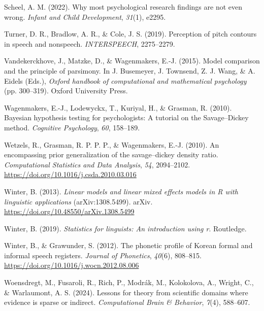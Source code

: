 \documentclass[
  doc,
  floatsintext,
  longtable,
  nolmodern,
  notxfonts,
  notimes,
  colorlinks=true,linkcolor=blue,citecolor=blue,urlcolor=blue]{apa7}
\newlength{\cslhangindent}
\newenvironment{CSLReferences}[2] %
 {\begin{list}{}{%
  \setlength{\itemindent}{0pt}
  \setlength{\leftmargin}{0pt}
  \setlength{\parsep}{0pt}
  \ifodd #1
   \setlength{\leftmargin}{\cslhangindent}
   \setlength{\itemindent}{-1\cslhangindent}
  \fi
  \setlength{\itemsep}{#2\baselineskip}}}
 {\end{list}}
\begin{document}
\begin{CSLReferences}{1}{0}
Scheel, A. M. (2022). Why most psychological research findings are not
even wrong. \emph{Infant and Child Development}, \emph{31}(1), e2295.

Turner, D. R., Bradlow, A. R., \& Cole, J. S. (2019). Perception of
pitch contours in speech and nonspeech. \emph{INTERSPEECH}, 2275--2279.

Vandekerckhove, J., Matzke, D., \& Wagenmakers, E.-J. (2015). Model
comparison and the principle of parsimony. In J. Busemeyer, J. Townsend,
Z. J. Wang, \& A. Eidels (Eds.), \emph{Oxford handbook of computational
and mathematical psychology} (pp. 300--319). Oxford University Press.

Wagenmakers, E.-J., Lodewyckx, T., Kuriyal, H., \& Grasman, R. (2010).
Bayesian hypothesis testing for psychologists: {A} tutorial on the
{S}avage--{D}ickey method. \emph{Cognitive Psychology}, \emph{60},
158--189.

Wetzels, R., Grasman, R. P. P. P., \& Wagenmakers, E.-J. (2010). An
encompassing prior generalization of the savage--dickey density ratio.
\emph{Computational Statistics and Data Analysis}, \emph{54},
2094--2102. \url{https://doi.org/10.1016/j.csda.2010.03.016}

Winter, B. (2013). \emph{Linear models and linear mixed effects models
in {R} with linguistic applications} (arXiv:1308.5499). arXiv.
\url{https://doi.org/10.48550/arXiv.1308.5499}

Winter, B. (2019). \emph{Statistics for linguists: An introduction using
r}. Routledge.

Winter, B., \& Grawunder, S. (2012). The phonetic profile of {Korean}
formal and informal speech registers. \emph{Journal of Phonetics},
\emph{40}(6), 808--815. \url{https://doi.org/10.1016/j.wocn.2012.08.006}

Woensdregt, M., Fusaroli, R., Rich, P., Modrák, M., Kolokolova, A.,
Wright, C., \& Warlaumont, A. S. (2024). Lessons for theory from
scientific domains where evidence is sparse or indirect.
\emph{Computational Brain \& Behavior}, \emph{7}(4), 588--607.

\end{CSLReferences}
\end{document}
